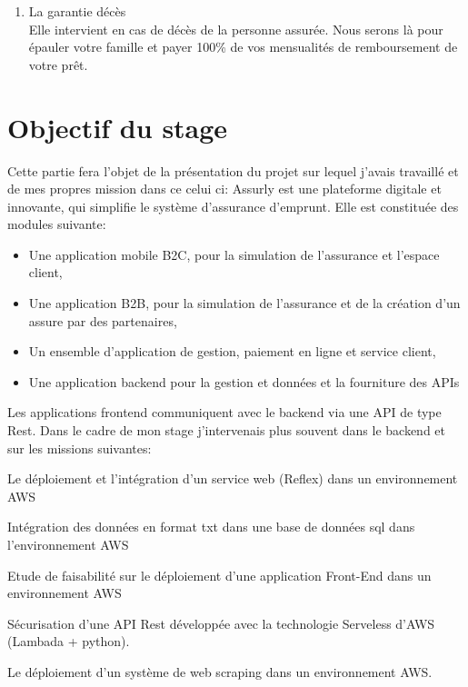 \begin{enumerate}
\begin{list}{label}{spacing}
\begin{enumerate}
	 	\textbf{La couverture Assurly} : Gigamesh sera là pour vous épauler et rembourser 100\% des mensualités du reste de votre prêt avec un plafond de 3 000 000 euros, quelle que soit votre perte de revenu. La garantie invalidité cesse au jour du 65ème anniversaire de l’assuré.
	 \end{enumerate}

\end{list}
\item La garantie décès\\
Elle intervient en cas de décès de la personne assurée. Nous serons là pour épauler votre famille et payer 100\% de vos mensualités de remboursement de votre prêt.

\end{enumerate}

\section{Objectif du stage}
Cette partie fera l’objet de la présentation du projet sur lequel j’avais travaillé et de mes propres mission dans ce celui ci:
Assurly est une plateforme digitale et innovante, qui simplifie le système d’assurance d’emprunt.
Elle est constituée des modules suivante:
\begin{itemize}
\item  Une application mobile B2C, pour la simulation de l’assurance et l’espace client,
\item  Une application B2B, pour la simulation de l’assurance et de la création d’un assure par des partenaires,
\item Un ensemble d’application de gestion, paiement en ligne et service client,
\item Une application backend pour la gestion et données et la fourniture des APIs
\end{itemize}

Les applications frontend communiquent avec le backend via une API de type Rest.
Dans le cadre de mon stage j’intervenais plus souvent dans le backend et sur les missions suivantes:

\begin{list}{•}
	\item Le déploiement et l’intégration d’un service web (Reflex) dans un environnement AWS
	\item Intégration des données en format txt dans une base de données sql dans l’environnement AWS
	\item Etude de faisabilité sur le déploiement d’une application Front-End dans un environnement AWS
	\item Sécurisation d’une API Rest développée avec la technologie Serveless d’AWS (Lambada + python).
	\item Le déploiement d’un système de web scraping dans un environnement AWS.
\end{list}





